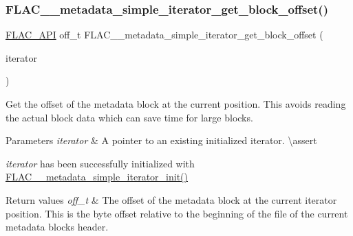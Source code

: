 \subsubsection{\texorpdfstring{FLAC\_\_metadata\_simple\_iterator\_get\_block\_offset()}{FLAC\_\_metadata\_simple\_iterator\_get\_block\_offset()}}
{\footnotesize\ttfamily \mbox{\hyperlink{group__flac__export_ga56ca07df8a23310707732b1c0007d6f5}{F\+L\+A\+C\+\_\+\+A\+PI}} off\+\_\+t F\+L\+A\+C\+\_\+\+\_\+metadata\+\_\+simple\+\_\+iterator\+\_\+get\+\_\+block\+\_\+offset (\begin{DoxyParamCaption}\item[{const \mbox{\hyperlink{group__flac__metadata__level1_ga6accccddbb867dfc2eece9ee3ffecb3a}{F\+L\+A\+C\+\_\+\+\_\+\+Metadata\+\_\+\+Simple\+Iterator}} $\ast$}]{iterator }\end{DoxyParamCaption})}

Get the offset of the metadata block at the current position. This avoids reading the actual block data which can save time for large blocks.


\begin{DoxyParams}{Parameters}
{\em iterator} & A pointer to an existing initialized iterator. \textbackslash{}assert 
\begin{DoxyCode}{1}
\end{DoxyCode}
 {\itshape iterator} has been successfully initialized with \mbox{\hyperlink{group__flac__metadata__level1_ga2a055cca4e6e06ae62517c8b0fa6e8a3}{F\+L\+A\+C\+\_\+\+\_\+metadata\+\_\+simple\+\_\+iterator\+\_\+init()}} \\
\hline
\end{DoxyParams}

\begin{DoxyRetVals}{Return values}
{\em off\+\_\+t} & The offset of the metadata block at the current iterator position. This is the byte offset relative to the beginning of the file of the current metadata block\textquotesingle{}s header. \\
\hline
\end{DoxyRetVals}
\mbox{\label{group__flac__metadata__level1_ga4649a49d230ac8bfc3ec88f5196205bb}} 
